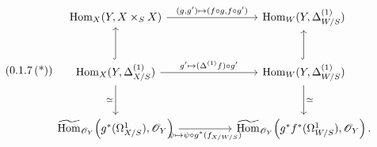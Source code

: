 \begin{equation}
\tag{0.1.7\,(*)}\label{sga3:iii:equation:0-1-7-star}
\begin{tikzcd}[column sep=huge,row sep=large]
  \operatorname{Hom}_X(Y,X\times_S X)
    \arrow[r,
      "{(g,g')\mapsto(f\circ g,f\circ g')}"]
  &
  \operatorname{Hom}_W(Y,\Delta^{(1)}_{W/S})
  \\
  \operatorname{Hom}_X(Y,\Delta^{(1)}_{X/S})
    \arrow[u,hook]
    \arrow[r,
      "{g'\mapsto(\Delta^{(1)}f)\circ g'}"]
    \arrow[d,"\simeq"']
  &
  \operatorname{Hom}_W(Y,\Delta^{(1)}_{W/S})
    \arrow[u,hook]
    \arrow[d,"\simeq"]
  \\
  \widetilde{\operatorname{Hom}}_{\mathscr O_Y}
    \!\left(g^*(\Omega^1_{X/S}),\mathscr O_Y\right)
    \arrow[r,
      "{\psi\mapsto
       \psi\circ g^*(f_{X/W/S})}"']
  &
  \widetilde{\operatorname{Hom}}_{\mathscr O_Y}
    \!\left(g^*f^*(\Omega^1_{W/S}),\mathscr O_Y\right).
\end{tikzcd}
\end{equation}
